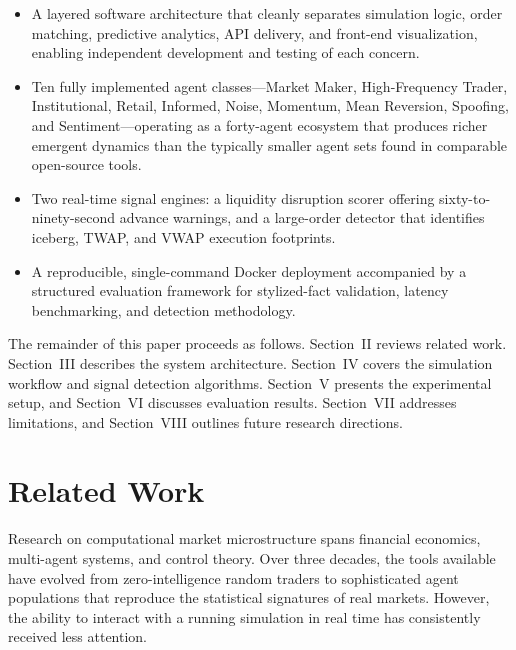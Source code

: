 \documentclass[conference]{IEEEtran}
\begin{document}
\begin{itemize}
    \item A layered software architecture that cleanly separates
    simulation logic, order matching, predictive analytics, API
    delivery, and front-end visualization, enabling independent
    development and testing of each concern.

    \item Ten fully implemented agent classes---Market Maker,
    High-Frequency Trader, Institutional, Retail, Informed, Noise,
    Momentum, Mean Reversion, Spoofing, and Sentiment---operating as
    a forty-agent ecosystem that produces richer emergent dynamics than
    the typically smaller agent sets found in comparable open-source
    tools.

    \item Two real-time signal engines: a liquidity disruption scorer
    offering sixty-to-ninety-second advance warnings, and a
    large-order detector that identifies iceberg, TWAP, and VWAP
    execution footprints.

    \item A reproducible, single-command Docker deployment
    accompanied by a structured evaluation framework for stylized-fact
    validation, latency benchmarking, and detection methodology.
\end{itemize}

The remainder of this paper proceeds as follows. Section~II reviews
related work. Section~III describes the system architecture.
Section~IV covers the simulation workflow and signal detection
algorithms. Section~V presents the experimental setup, and
Section~VI discusses evaluation results. Section~VII addresses
limitations, and Section~VIII outlines future research directions.

\section{Related Work}

Research on computational market microstructure spans financial
economics, multi-agent systems, and control theory. Over three
decades, the tools available have evolved from zero-intelligence
random traders to sophisticated agent populations that reproduce the
statistical signatures of real markets. However, the ability to
interact with a running simulation in real time has consistently
received less attention.
\end{document}
